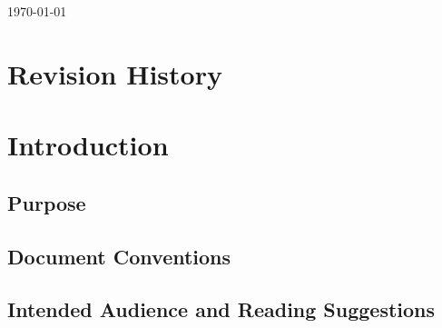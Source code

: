 \documentclass[11pt]{article}
\begin{document}
\begin{titlepage}
	\vfill\vfill\vfill 
	{\large\today} 

	\vfill 

\end{titlepage}


\tableofcontents
\newpage

\section*{Revision History}
\newpage


\section{Introduction}
\label{sec:introduction}

\subsection{Purpose}
\label{sec:purpose}

\subsection{Document Conventions}
\label{sec:conventions}

\subsection{Intended Audience and Reading Suggestions}
\label{sec:audience}
\end{document}
